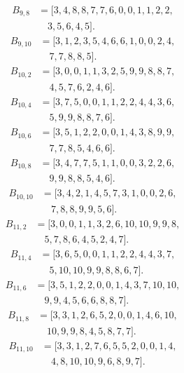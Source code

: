 \documentclass[11pt,a4paper]{article}
\theoremstyle{definition}\newtheorem{definition}[theorem]{Definition}
\theoremstyle{remark}\newtheorem{remark}[theorem]{Remark}
\begin{document}
\[\begin{aligned}
B_{9,8}&=[3,4,8,8,7,7,6,0,0,1,1,2,2,\\
&\quad 3,5,6,4,5].
\end{aligned}\]
\[\begin{aligned}
B_{9,10}&=[3,1,2,3,5,4,6,6,1,0,0,2,4,\\
&\quad 7,7,8,8,5].
\end{aligned}\]
\[\begin{aligned}
B_{10,2}&=[3,0,0,1,1,3,2,5,9,9,8,8,7,\\
&\quad 4,5,7,6,2,4,6].
\end{aligned}\]
\[\begin{aligned}
B_{10,4}&=[3,7,5,0,0,1,1,2,2,4,4,3,6,\\
&\quad 5,9,9,8,8,7,6].
\end{aligned}\]
\[\begin{aligned}
B_{10,6}&=[3,5,1,2,2,0,0,1,4,3,8,9,9,\\
&\quad 7,7,8,5,4,6,6].
\end{aligned}\]
\[\begin{aligned}
B_{10,8}&=[3,4,7,7,5,1,1,0,0,3,2,2,6,\\
&\quad 9,9,8,8,5,4,6].
\end{aligned}\]
\[\begin{aligned}
B_{10,10}&=[3,4,2,1,4,5,7,3,1,0,0,2,6,\\
&\quad 7,8,8,9,9,5,6].
\end{aligned}\]
\[\begin{aligned}
B_{11,2}&=[3,0,0,1,1,3,2,6,10,10,9,9,8,\\
&\quad 5,7,8,6,4,5,2,4,7].
\end{aligned}\]
\[\begin{aligned}
B_{11,4}&=[3,6,5,0,0,1,1,2,2,4,4,3,7,\\
&\quad 5,10,10,9,9,8,8,6,7].
\end{aligned}\]
\[\begin{aligned}
B_{11,6}&=[3,5,1,2,2,0,0,1,4,3,7,10,10,\\
&\quad 9,9,4,5,6,6,8,8,7].
\end{aligned}\]
\[\begin{aligned}
B_{11,8}&=[3,3,1,2,6,5,2,0,0,1,4,6,10,\\
&\quad 10,9,9,8,4,5,8,7,7].
\end{aligned}\]
\[\begin{aligned}
B_{11,10}&=[3,3,1,2,7,6,5,5,2,0,0,1,4,\\
&\quad 4,8,10,10,9,6,8,9,7].
\end{aligned}\]
\end{document}
